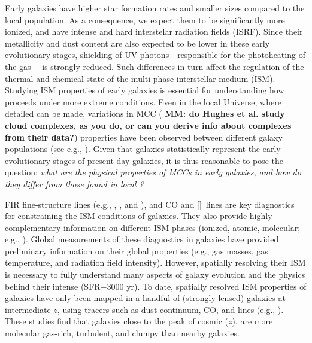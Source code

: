 \IfFileExists{emulateapjlegacy.cls}{\documentclass[iop]{emulateapjlegacy}}{\documentclass[iop]{emulateapj}}
\newcommand{\MM}[1]{({\bf \color{mmcolor} MM: #1})}
\begin{document}
Early galaxies have higher star formation rates \citep[SFR; ][]{Behroozi13b, Sparre15a, Maiolino15a, Dunlop17a} and smaller sizes \citep[e.g.,][]{Bouwens11a, Ono13a} compared to the local population. 
%
As a consequence, we expect them to be significantly more ionized, and have intense and hard interstelar radiation fields (ISRF). Since their metallicity and dust content are also expected to be lower in these early evolutionary stages, shielding of UV photons---responsible for the photoheating of the gas---  is strongly reduced. Such differences in turn affect the regulation of the thermal and chemical state of the multi-phase interstellar medium (ISM). Studying ISM properties of early galaxies is essential for understanding how \SF proceeds under more extreme conditions.
%
Even in the local Universe, where detailed \obs can be made, variations in 
     MCC  \MM{do Hughes et al. study cloud complexes, as you do, or can you derive info about complexes from their data?}
properties have been observed between different galaxy populations (see e.g., \citealt{Hughes10a, Hughes13b}).  Given that \highz galaxies statistically represent the early evolutionary stages of present-day galaxies, it is thus reasonable to pose the question: {\it what are the physical properties of MCCs in early galaxies, and how do they differ from those found in local \galpop?}
%

FIR fine-structure lines (e.g., \cii, \nii, and \oiii), and CO and [\ci]~lines are key diagnostics for constraining the ISM conditions of galaxies. They also provide highly complementary information on different ISM phases (ionized, atomic, molecular; e.g., \citealt{Scoville74a, Rubin85a, Malhotra01a}).
%
Global measurements of these diagnostics in \highz galaxies have provided preliminary information on their global properties (e.g., gas masses, gas temperature, and radiation field intensity). However, spatially resolving their ISM is necessary to fully understand many aspects of galaxy evolution and the physics behind their intense \SF (SFR$-$3000\,\Msun\,yr\pmOne).
%
To date, spatially resolved ISM properties of \highz galaxies have only been mapped in a handful of (strongly-lensed) galaxies at intermediate-$z$, using tracers such as dust continuum, CO, and \cii lines (e.g., \citealt{Swinbank11a, Hodge15a, Ferkinhoff15a, Hodge16a, Leung19a}). These studies find that galaxies close to the peak of cosmic \SF ($z$), are more molecular gas-rich, turbulent, and clumpy than nearby galaxies.
\end{document}
